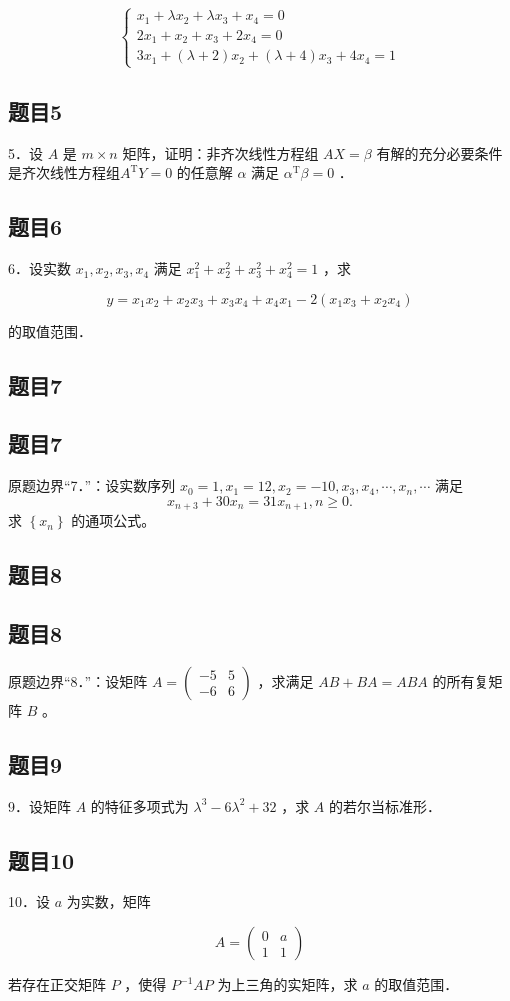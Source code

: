 \documentclass{article}
\begin{document}
\[
\left\{\begin{array}{l}
x_{1}+\lambda x_{2}+\lambda x_{3}+x_{4}=0 \\
2 x_{1}+x_{2}+x_{3}+2 x_{4}=0 \\
3 x_{1}+(\lambda+2) x_{2}+(\lambda+4) x_{3}+4 x_{4}=1
\end{array}\right.
\]

\subsection{题目5}
5．设 \(A\) 是 \(m \times n\) 矩阵，证明：非齐次线性方程组 \(A X=\beta\) 有解的充分必要条件是齐次线性方程组\(A^{\mathrm{T}} Y=0\) 的任意解 \(\alpha\) 满足 \(\alpha^{\mathrm{T}} \beta=0\) ．

\subsection{题目6}
6．设实数 \(x_{1}, x_{2}, x_{3}, x_{4}\) 满足 \(x_{1}^{2}+x_{2}^{2}+x_{3}^{2}+x_{4}^{2}=1\) ，求

\[
y=x_{1} x_{2}+x_{2} x_{3}+x_{3} x_{4}+x_{4} x_{1}-2\left(x_{1} x_{3}+x_{2} x_{4}\right)
\]

的取值范围．

\begin{itemize}

\subsection{题目7}
\end{itemize}

\subsection{题目7}
原题边界“7．”：设实数序列 \(x_{0}=1, x_{1}=12, x_{2}=-10, x_{3}, x_{4}, \cdots, x_{n}, \cdots\) 满足
\[
x_{n+3}+30 x_{n}=31 x_{n+1}, n \geq 0 .
\]
求 \(\left\{x_{n}\right\}\) 的通项公式。

\subsection{题目8}

\subsection{题目8}
原题边界“8．”：设矩阵 \(A=\left(\begin{array}{ll}-5 & 5 \\ -6 & 6\end{array}\right)\) ，求满足 \(A B+B A=A B A\) 的所有复矩阵 \(B\) 。

\subsection{题目9}
9．设矩阵 \(A\) 的特征多项式为 \(\lambda^{3}-6 \lambda^{2}+32\) ，求 \(A\) 的若尔当标准形．

\subsection{题目10}
10．设 \(a\) 为实数，矩阵

\[
A=\left(\begin{array}{ll}
0 & a \\
1 & 1
\end{array}\right)
\]

若存在正交矩阵 \(P\) ，使得 \(P^{-1} A P\) 为上三角的实矩阵，求 \(a\) 的取值范围．
\end{document}
